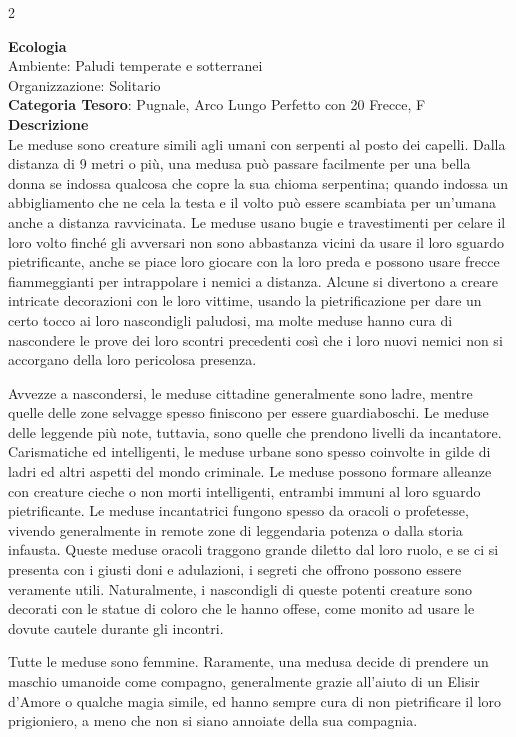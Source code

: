 \begin{multicols}{2}
{\textbf{Ecologia}\\
Ambiente: Paludi temperate e sotterranei\\
Organizzazione: Solitario\\
\textbf{Categoria Tesoro}: Pugnale, Arco Lungo Perfetto con 20 Frecce, F\\
\textbf{Descrizione}\\
Le meduse sono creature simili agli umani con serpenti al posto dei capelli. Dalla distanza di 9 metri o più, una medusa può passare facilmente per una bella donna se indossa qualcosa che copre la sua chioma serpentina; quando indossa un abbigliamento che ne cela la testa e il volto può essere scambiata per un'umana anche a distanza ravvicinata. Le meduse usano bugie e travestimenti per celare il loro volto finché gli avversari non sono abbastanza vicini da usare il loro sguardo pietrificante, anche se piace loro giocare con la loro preda e possono usare frecce fiammeggianti per intrappolare i nemici a distanza. Alcune si divertono a creare intricate decorazioni con le loro vittime, usando la pietrificazione per dare un certo tocco ai loro nascondigli paludosi, ma molte meduse hanno cura di nascondere le prove dei loro scontri precedenti così che i loro nuovi nemici non si accorgano della loro pericolosa presenza.

Avvezze a nascondersi, le meduse cittadine generalmente sono ladre, mentre quelle delle zone selvagge spesso finiscono per essere guardiaboschi. Le meduse delle leggende più note, tuttavia, sono quelle che prendono livelli da incantatore. Carismatiche ed intelligenti, le meduse urbane sono spesso coinvolte in gilde di ladri ed altri aspetti del mondo criminale. Le meduse possono formare alleanze con creature cieche o non morti intelligenti, entrambi immuni al loro sguardo pietrificante. Le meduse incantatrici fungono spesso da oracoli o profetesse, vivendo generalmente in remote zone di leggendaria potenza o dalla storia infausta. Queste meduse oracoli traggono grande diletto dal loro ruolo, e se ci si presenta con i giusti doni e adulazioni, i segreti che offrono possono essere veramente utili. Naturalmente, i nascondigli di queste potenti creature sono decorati con le statue di coloro che le hanno offese, come monito ad usare le dovute cautele durante gli incontri.

Tutte le meduse sono femmine. Raramente, una medusa decide di prendere un maschio umanoide come compagno, generalmente grazie all'aiuto di un Elisir d'Amore o qualche magia simile, ed hanno sempre cura di non pietrificare il loro prigioniero, a meno che non si siano annoiate della sua compagnia.

}
\end{multicols}
